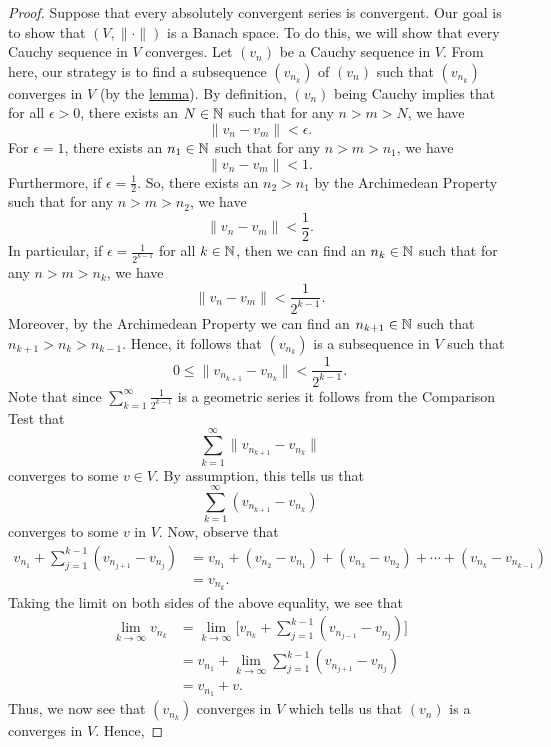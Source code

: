 \documentclass[a4paper]{article}
\begin{document}
\begin{proof}
Suppose that every absolutely convergent series is convergent. Our goal is to show that \( (V, \|\cdot\|) \) is a Banach space. To do this, we will show that every Cauchy sequence in \( V  \) converges. Let \( ({v}_{n}) \) be a Cauchy sequence in \( V  \). From here, our strategy is to find a subsequence \( ({v}_{{n}_{k}}) \) of \( ({v}_{n}) \) such that \( ({v}_{{n}_{k}}) \) converges in \( V  \) (by the {\hyperref[lemma]{lemma}}). By definition, \( ({v}_{n}) \) being Cauchy implies that for all \( \epsilon > 0  \), there exists an \( N \in \mathbb{N} \) such that for any \( n > m > N  \), we have 
\[  \|{v}_{n} - {v}_{m}\| < \epsilon. \]
For \( \epsilon = 1 \), there exists an \( {n}_{1} \in \mathbb{N} \) such that for any \( n > m > {n}_{1} \), we have 
\[  \|{v}_{n} - {v}_{m}\| < 1. \]
Furthermore, if \( \epsilon = \frac{ 1 }{ 2 }   \). So, there exists an \( {n}_{2} > {n}_{1} \) by the Archimedean Property such that for any \( n > m > {n}_{2} \), we have 
\[  \|{v}_{n} - {v}_{m}\| < \frac{ 1 }{ 2 }. \] 
In particular, if \( \epsilon = \frac{ 1 }{ 2^{k-1} }   \) for all \( k \in \mathbb{N} \), then we can find an \( {n}_{k} \in \mathbb{N} \) 
such that for any \( n > m > {n}_{k}   \), we have 
\[  \|{v}_{n} - {v}_{m}\| < \frac{ 1 }{ 2^{k-1} }. \]
Moreover, by the Archimedean Property we can find an \( {n}_{k+1} \in \mathbb{N}    \) such that \( {n}_{k+1} > {n}_{k} > {n}_{k-1} \). Hence, it follows that \( ({v}_{{n}_{k}} ) \) is a subsequence in \( V  \) such that
\[   0 \leq  \|{v}_{{n}_{k+1}} - {v}_{{n}_{k}} \| < \frac{ 1 }{ 2^{k-1} }. \tag{*} \]
Note that since \( \sum_{ k=1  }^{ \infty  } \frac{ 1 }{ 2^{k-1} }  \) is a geometric series it follows from the Comparison Test that  
\[  \sum_{ k=1  }^{ \infty  } \|{v}_{{n}_{k+1}} - {v}_{{n}_{k}} \|   \]
converges to some \( v \in V  \). By assumption, this tells us that 
\[  \sum_{ k=1  }^{ \infty  } ({v}_{{n}_{k+1}} - {v}_{{n}_{k}})  \]
converges to some \( v  \) in \( V  \). Now, observe that 
\begin{align*}
    {v}_{{n}_{1}} + \sum_{ j=1  }^{ k - 1  } ({v}_{{n}_{j+1}} - {v}_{{n}_{j}}) &= {v}_{{n}_{1}} + ({v}_{{n}_{2}} - {v}_{{n}_{1}}) + ({v}_{{n}_{3}} - {v}_{{n}_{2}}) + \cdots + ({v}_{{n}_{k}} - {v}_{{n}_{k-1}}) \\ &= {v}_{{n}_{k}}.  
\end{align*}
Taking the limit on both sides of the above equality, we see that 
\begin{align*}
    \lim_{ k  \to \infty  }  {v}_{{n}_{k}} &= \lim_{ k  \to \infty  }  \Big[ {v}_{{n}_{k }} + \sum_{ j=1  }^{ k - 1  } ({v}_{{n}_{j-1}} - {v}_{{n}_{j}})\Big]  \\
                                           &= {v}_{{n}_{1}} + \lim_{ k  \to \infty  }  \sum_{ j=1  }^{ k-1  } ({v}_{{n}_{j+1}} - {v}_{{n}_{j}}) \\
                                           &= {v}_{{n}_{1}} + v.
\end{align*}
Thus, we now see that \( ({v}_{{n}_{k}}) \) converges in \( V  \) which tells us that \( ({v}_{n}) \) is a converges in \( V  \). Hence, 
\end{proof}
\end{document}

